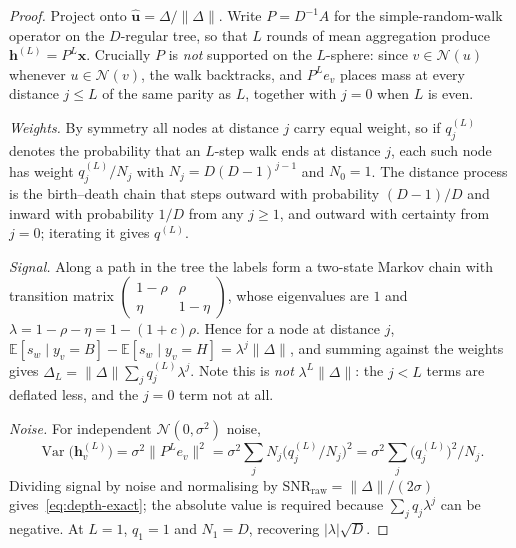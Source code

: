 \documentclass[../elsevier.tex]{subfiles}
\begin{document}
\begin{proof}
Project onto $\hat{\mathbf{u}} = \Delta/\|\Delta\|$. Write $P = D^{-1}A$ for the
simple-random-walk operator on the $D$-regular tree, so that $L$ rounds of mean
aggregation produce $\mathbf{h}^{(L)} = P^{L}\mathbf{x}$. Crucially $P$ is
\emph{not} supported on the $L$-sphere: since $v \in \mathcal{N}(u)$ whenever
$u \in \mathcal{N}(v)$, the walk backtracks, and $P^L e_v$ places mass at every
distance $j \le L$ of the same parity as $L$, together with $j=0$ when $L$ is even.

\emph{Weights.} By symmetry all nodes at distance $j$ carry equal weight, so if
$q^{(L)}_j$ denotes the probability that an $L$-step walk ends at distance $j$, each
such node has weight $q^{(L)}_j/N_j$ with $N_j = D(D-1)^{j-1}$ and $N_0 = 1$. The
distance process is the birth--death chain that steps outward with probability
$(D-1)/D$ and inward with probability $1/D$ from any $j\ge1$, and outward with
certainty from $j=0$; iterating it gives $q^{(L)}$.

\emph{Signal.} Along a path in the tree the labels form a two-state Markov chain with
transition matrix $\begin{pmatrix} 1-\rho & \rho\\ \eta & 1-\eta\end{pmatrix}$, whose
eigenvalues are $1$ and $\lambda = 1-\rho-\eta = 1-(1+c)\rho$. Hence for a node at
distance $j$,
$\mathbb{E}[s_w \mid y_v = B] - \mathbb{E}[s_w \mid y_v = H] = \lambda^{j}\|\Delta\|$,
and summing against the weights gives
$\Delta_L = \|\Delta\|\sum_j q^{(L)}_j \lambda^{j}$. Note this is \emph{not}
$\lambda^L\|\Delta\|$: the $j<L$ terms are deflated less, and the $j=0$ term not at
all.

\emph{Noise.} For independent $\mathcal{N}(0,\sigma^2)$ noise,
\[
  \operatorname{Var}\bigl(\mathbf{h}^{(L)}_v\bigr)
  = \sigma^2\bigl\|P^Le_v\bigr\|^2
  = \sigma^2\sum_j N_j \bigl(q^{(L)}_j/N_j\bigr)^2
  = \sigma^2\sum_j \bigl(q^{(L)}_j\bigr)^2 / N_j .
\]
Dividing signal by noise and normalising by
$\mathrm{SNR}_{\mathrm{raw}} = \|\Delta\|/(2\sigma)$ gives~\eqref{eq:depth-exact};
the absolute value is required because $\sum_j q_j\lambda^j$ can be negative.
At $L=1$, $q_1=1$ and $N_1=D$, recovering $|\lambda|\sqrt{D}$.
\end{proof}
\end{document}
